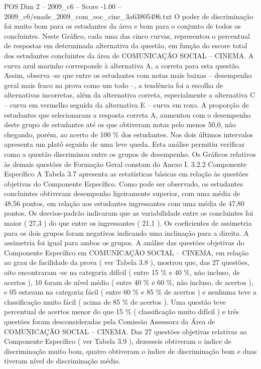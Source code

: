 \begin{textsample}{POS Dim 2 – 2009\_c6 – Score -1.00 – 2009\_c6/enade\_2009\_com\_soc\_cine\_3a63805496.txt}
O poder de discriminação foi muito bom para os estudantes da área e bom para o conjunto de todos os concluintes.
Neste Gráfico, cada uma das cinco curvas, representou o percentual de respostas em determinada alternativa da questão, em função do escore total dos estudantes concluintes da área de COMUNICAÇÃO SOCIAL – CINEMA.
A curva azul marinho corresponde à alternativa A, a correta para esta questão.
Assim, observa -se que entre os estudantes com notas mais baixas – desempenho geral mais fraco na prova como um todo –, a tendência foi a escolha de alternativas incorretas, além da alternativa correta, especialmente a alternativa C – curva em vermelho seguida da alternativa E – curva em roxo.
A proporção de estudantes que selecionaram a resposta correta A, aumentou com o desempenho deste grupo de estudantes até os que obtiveram notas pelo menos 50,0, não chegando, porém, ao acerto de 100 \% dos estudantes.
Nos dois últimos intervalos apresenta um platô seguido de uma leve queda.
Esta análise permitiu verificar como a questão discriminou entre os grupos de desempenho.
Os Gráficos relativos às demais questões de Formação Geral constam do Anexo I. 3.2.2 Componente Específico A Tabela 3.7 apresenta as estatísticas básicas em relação às questões objetivas do Componente Específico.
Como pode ser observado, os estudantes concluintes obtiveram desempenho ligeiramente superior, com uma média de 48,56 pontos, em relação aos estudantes ingressantes com uma média de 47,80 pontos.
Os desvios-padrão indicaram que as variabilidade entre os concluintes foi maior ( 27,3 ) do que entre os ingressantes ( 21,1 ).
Os coeficientes de assimetria para os dois grupos foram negativos indicando uma inclinação para a direita.
A assimetria foi igual para ambos os grupos.
A análise das questões objetivas do Componente Específico em COMUNICAÇÃO SOCIAL – CINEMA, em relação ao grau de facilidade da prova ( ver Tabela 3.8 ), mostrou que, das 27 questões, oito encontraram -se na categoria difícil ( entre 15 \% e 40 \%, não incluso, de acertos ), 10 foram de nível médio ( entre 40 \% e 60 \%, não incluso, de acertos ), e 05 estavam na categoria fácil ( entre 60 \% e 85 \% de acertos ) e nenhuma teve a classificação muito fácil ( acima de 85 \% de acertos ).
Uma questão teve percentual de acertos menor do que 15 \% ( classificação muito difícil ) e três questões foram desconsideradas pela Comissão Assessora da Área de COMUNICAÇÃO SOCIAL – CINEMA.
Das 27 questões objetivas relativas ao Componente Específico ( ver Tabela 3.9 ), dezesseis obtiveram o índice de discriminação muito bom, quatro obtiveram o índice de discriminação bom e duas tiveram nível de discriminação médio.

\end{textsample}
